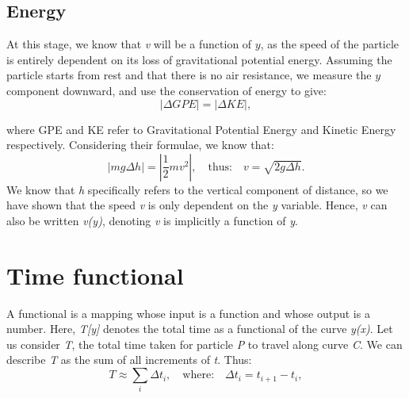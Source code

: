 \documentclass{article}
\begin{document}
\subsection{Energy}
At this stage, we know that \textit{v} will be a function of $y$, as the speed of the particle is entirely dependent on its loss of gravitational potential energy. 
Assuming the particle starts from rest and that there is no air resistance, we measure the $y$ component downward, and use the conservation of energy to give:
\begin{equation}
     | \Delta GPE | = | \Delta KE |,
\end{equation}

where GPE and KE refer to Gravitational Potential Energy and Kinetic Energy respectively. 
Considering their formulae, we know that:
\begin{equation}
    | mg \Delta h | = | \frac{1}{2} mv^2|, \quad \text{thus:} \quad v = \sqrt{2g \Delta h}.
\end{equation}
We know that \textit{h} specifically refers to the vertical component of distance, so we have shown that the speed \textit{v} is only dependent on the \textit{y} variable. Hence, \textit{v} can also be written \textit{v(y)}, denoting \textit{v} is implicitly a function of \textit{y}.
\section{Time functional}
A functional is a mapping whose input is a function and whose output is a number. Here, \textit{T[y]} denotes the total time as a functional of the curve \textit{y(x)}. Let us consider \textit{T}, the total time taken for particle \textit{P} to travel along curve \textit{C}. We can describe \textit{T} as the sum of all increments of \textit{t}. Thus:
\begin{equation}
    T \approx \sum_i \Delta t_i, \quad \text{where:} \quad \Delta t_i = t_{i+1} - t_i,
\end{equation}
\end{document}

